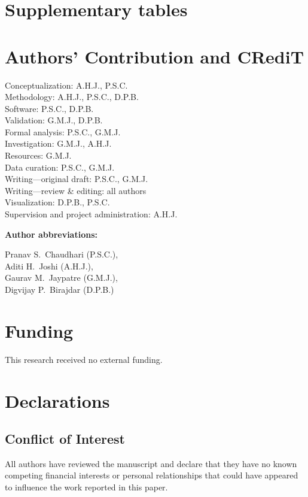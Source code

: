 \documentclass[11pt,a4paper]{article}
\DeclareRobustCommand*{\_}{\textunderscore\hskip0pt\relax}
\begin{document}
\section{Supplementary tables}\label{app:tables}







\FloatBarrier

\section*{Authors' Contribution and CRediT}
\noindent Conceptualization: A.H.J., P.S.C.\\
\noindent Methodology: A.H.J., P.S.C., D.P.B.\\
\noindent Software: P.S.C., D.P.B.\\
\noindent Validation: G.M.J., D.P.B.\\
\noindent Formal analysis: P.S.C., G.M.J.\\
\noindent Investigation: G.M.J., A.H.J.\\
\noindent Resources: G.M.J.\\
\noindent Data curation: P.S.C., G.M.J.\\
\noindent Writing---original draft: P.S.C., G.M.J.\\
\noindent Writing---review \& editing: all authors\\
\noindent Visualization: D.P.B., P.S.C.\\
\noindent Supervision and project administration: A.H.J.

\medskip\noindent\textbf{Author abbreviations:}\par
\noindent Pranav S.\ Chaudhari (P.S.C.),\\
\noindent Aditi H.\ Joshi (A.H.J.),\\
\noindent Gaurav M.\ Jaypatre (G.M.J.),\\
\noindent Digvijay P.\ Birajdar (D.P.B.)

\section*{Funding}
This research received no external funding.

\section*{Declarations}
\subsection*{Conflict of Interest}
All authors have reviewed the manuscript and declare that they have no known competing financial interests or personal relationships that could have appeared to influence the work reported in this paper.
\end{document}
